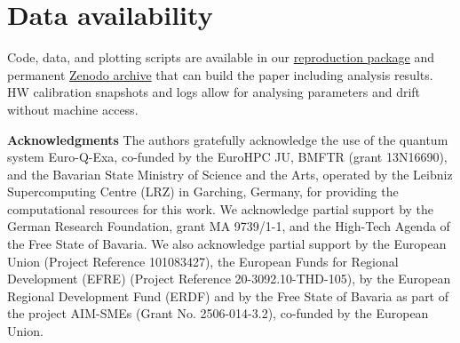 \documentclass[10pt,conference]{IEEEtran}
\newcommand{\repro}{\href{https://github.com/lfd/qce26_claim_against_measurement}{reproduction package\xspace}}
\newcommand{\zenodo}{\href{https://doi.org/10.5281/zenodo.21538274}{Zenodo archive\xspace}}
\begin{document}
\section*{Data availability}
Code, data, and plotting scripts are available in our \repro{} and permanent \zenodo{} that can build the paper including analysis results. HW calibration snapshots and logs allow for analysing parameters and drift without machine access.

\begin{small}\noindent\textbf{Acknowledgments}
The authors gratefully acknowledge the use of the quantum system Euro-Q-Exa, co-funded by the EuroHPC JU, BMFTR (grant 13N16690), and the Bavarian State Ministry of Science and the Arts, operated by the Leibniz Supercomputing Centre (LRZ) in Garching, Germany, for providing the computational resources for this work. We acknowledge partial support by the German Research Foundation, grant MA 9739/1-1, and the High-Tech Agenda of the Free State of Bavaria. We also acknowledge partial support by the European Union (Project Reference 101083427), the European Funds for Regional Development (EFRE) (Project Reference 20-3092.10-THD-105), by the European Regional Development Fund (ERDF) and by the Free State of Bavaria as part of the project AIM-SMEs (Grant No. 2506-014-3.2), co-funded by the European Union. 
\end{small}

\printbibliography
\end{document}
